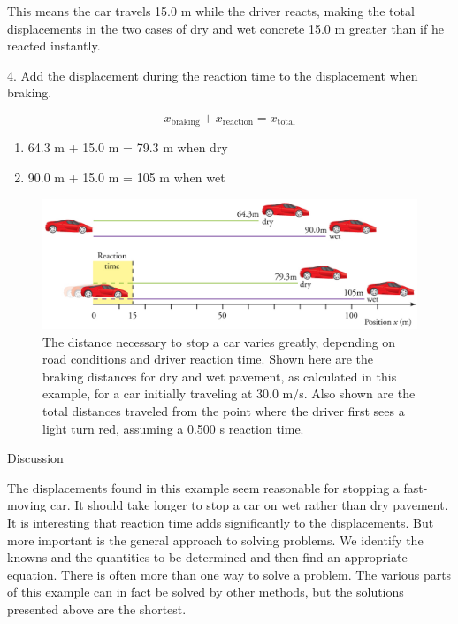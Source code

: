 \documentclass[
]{book}
\providecommand{\tightlist}{%
  \setlength{\itemsep}{0pt}\setlength{\parskip}{0pt}}
\newenvironment{tinysection}{}{}
\begin{document}
This means the car travels 15.0 m while the driver reacts, making the
total displacements in the two cases of dry and wet concrete 15.0 m
greater than if he reacted instantly.

4. Add the displacement during the reaction time to the displacement
when braking.

\leavevmode\hypertarget{import-auto-id1658817}{}%
\[{{x_{\text{braking}} + x_{\text{reaction}}} = x_{\text{total}}}{}\]

\begin{enumerate}
\def\labelenumi{\alph{enumi}.}
\tightlist
\item
  \protect\hypertarget{import-auto-id1658854}{}{64.3 m + 15.0 m = 79.3 m when dry}
\item
  \protect\hypertarget{import-auto-id1658828}{}{90.0 m + 15.0 m = 105 m when wet}
\end{enumerate}

\begin{figure}
\hypertarget{import-auto-id1658840}{%
\centering
\includegraphics{images/Figure_02_04_03.jpg}
\caption{The distance necessary to stop a car varies greatly, depending on road
conditions and driver reaction time. Shown here are the braking
distances for dry and wet pavement, as calculated in this example, for a
car initially traveling at 30.0 m/s. Also shown are the total distances
traveled from the point where the driver first sees a light turn red,
assuming a 0.500 s reaction
time.}\label{import-auto-id1658840}
}
\end{figure}

\begin{tinysection}

{Discussion}

\end{tinysection}

The displacements found in this example seem reasonable for stopping a
fast-moving car. It should take longer to stop a car on wet rather than
dry pavement. It is interesting that reaction time adds significantly to
the displacements. But more important is the general approach to solving
problems. We identify the knowns and the quantities to be determined and
then find an appropriate equation. There is often more than one way to
solve a problem. The various parts of this example can in fact be solved
by other methods, but the solutions presented above are the shortest.
\end{document}
